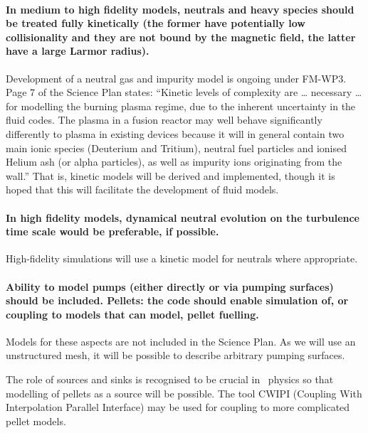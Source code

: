 \paragraph{In medium to high fidelity models, neutrals and heavy species should
be treated fully kinetically (the former have potentially low collisionality
and they are not bound by the magnetic field, the latter have a large Larmor
radius).}

Development of a neutral gas and impurity model is ongoing under FM-WP3. 
Page 7 of the Science Plan states: {\green ``Kinetic levels of complexity are \ldots
necessary \ldots for modelling the burning plasma regime, due to the inherent
uncertainty in the fluid codes. 
The plasma in a fusion reactor may well behave significantly differently to
plasma in existing devices because it will in general contain two main ionic
species (Deuterium and Tritium), neutral fuel particles and ionised Helium ash
(or alpha particles), as well as impurity ions originating from the wall.''}
That is, kinetic models will be derived and implemented, though it is hoped
that this will facilitate the development of fluid models.

\paragraph{In high fidelity models, dynamical neutral evolution on the
turbulence time scale would be preferable, if possible.}
High-fidelity simulations will use a kinetic model for neutrals where appropriate. 

\paragraph{Ability to model pumps (either directly or via pumping surfaces)
should be included. Pellets: the code should enable simulation of, or coupling
to models that can model, pellet fuelling.}
Models for these aspects are not included in the Science Plan.
As we will use an unstructured mesh, it will be possible to describe arbitrary
pumping surfaces.

The role of sources and sinks is recognised to be crucial in \nep\ physics so
that modelling of pellets as a source will be possible.
The tool CWIPI (Coupling With Interpolation Parallel Interface) may be used for
coupling to more complicated pellet models.
